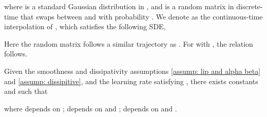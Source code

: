 where  is a standard Gaussian distribution in , and  is a random matrix in discrete-time that swaps between  and  with probability . We denote  as the continuous-time interpolation of , which satisfies the following SDE, 

Here the random matrix  follows a similar trajectory as . For  with , the relation  follows.


\begin{lemma}\label{discretization}
Given the smoothness and dissipativity assumptions \eqref{assump: lip and alpha beta} and \eqref{assump: dissipitive}, and the learning rate  satisfying , there exists constants  and  such that

where  depends on ;  depends on  and ;  depends on  and .
\end{lemma}{}

